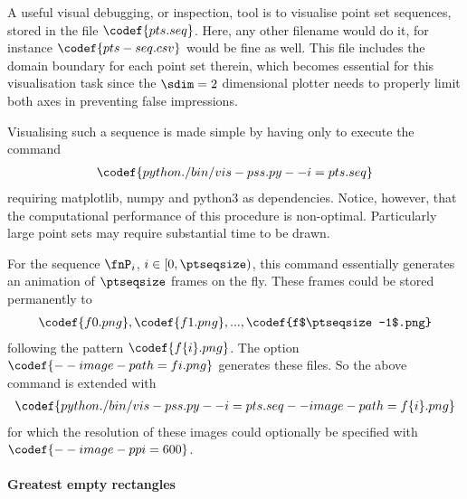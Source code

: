 %
A useful visual debugging, or inspection, tool is to visualise point set sequences, stored in the file $\codef{pts.seq}$. Here, any other filename would do it, for instance $\codef{pts-seq.csv}$ would be fine as well. This file includes the domain boundary for each point set therein, which becomes essential for this visualisation task since the $\sdim=2$ dimensional plotter needs to properly limit both axes in preventing false impressions.

Visualising such a sequence is made simple by having only to execute the command
\begin{align*}
  \codef{python ./bin/vis-pss.py --i=pts.seq}
\end{align*}
requiring matplotlib, numpy and python3 as dependencies. Notice, however, that the computational performance of this procedure is non-optimal. Particularly large point sets may require substantial time to be drawn.

For the sequence $\fnP_i$, $i \in [0,\ptseqsize)$, this command essentially generates an animation of $\ptseqsize$ frames on the fly. These frames could be stored permanently to
\begin{align*}
  \codef{f0.png}, \codef{f1.png}, ..., \codef{f$\ptseqsize-1$.png}
\end{align*}
following the pattern $\codef{f\{i\}.png}$. The option $\codef{--image-path=f{i}.png}$ generates these files. So the above command is extended with
\begin{align*}
  \codef{python ./bin/vis-pss.py --i=pts.seq --image-path=f\{i\}.png}
\end{align*}
for which the resolution of these images could optionally be specified with $\codef{--image-ppi=600}$.

\paragraph{Greatest empty rectangles}

